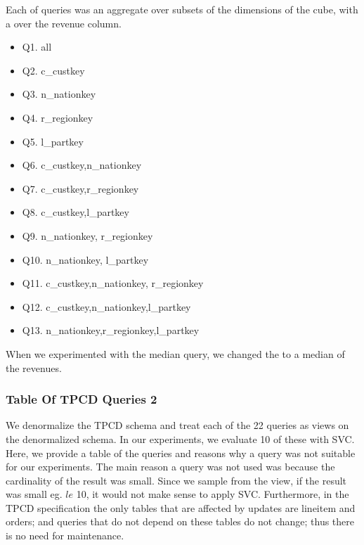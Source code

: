 Each of queries was an aggregate over subsets of the dimensions of the cube, 
with a \sumfunc over the revenue column.
\begin{itemize}
\item Q1. all
\item Q2. c\_custkey
\item Q3. n\_nationkey
\item Q4. r\_regionkey
\item Q5. l\_partkey
\item Q6. c\_custkey,n\_nationkey
\item Q7. c\_custkey,r\_regionkey
\item Q8. c\_custkey,l\_partkey
\item Q9. n\_nationkey, r\_regionkey
\item Q10. n\_nationkey, l\_partkey
\item Q11. c\_custkey,n\_nationkey, r\_regionkey
\item Q12. c\_custkey,n\_nationkey,l\_partkey
\item Q13. n\_nationkey,r\_regionkey,l\_partkey
\end{itemize}

When we experimented with the median query, we changed the \sumfunc to a median of the revenues.

\subsubsection{Table Of TPCD Queries 2}
We denormalize the TPCD schema and treat each of the 22 queries as views on the denormalized schema.
In our experiments, we evaluate 10 of these with SVC. 
Here, we provide a table of the queries and reasons why a query was not suitable for our experiments.
The main reason a query was not used was because the cardinality of the result was small.
Since we sample from the view, if the result was small eg. $le$ 10, it would not make sense to apply SVC.
Furthermore, in the TPCD specification the only tables that are affected by updates are lineitem and orders; and queries that
do not depend on these tables do not change; thus there is no need for maintenance.

